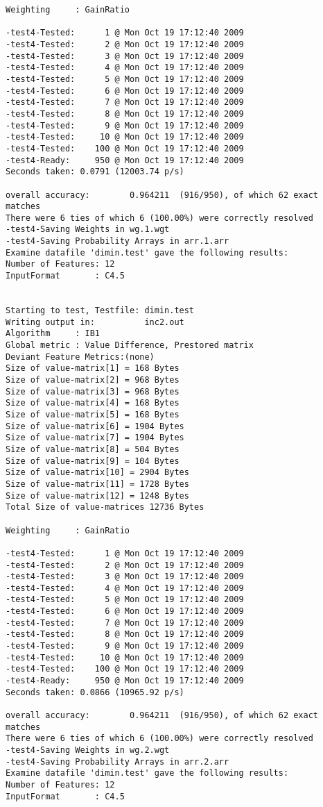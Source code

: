 \documentclass{report}
\begin{document}
\begin{footnotesize}
\begin{verbatim}
Weighting     : GainRatio

-test4-Tested:      1 @ Mon Oct 19 17:12:40 2009
-test4-Tested:      2 @ Mon Oct 19 17:12:40 2009
-test4-Tested:      3 @ Mon Oct 19 17:12:40 2009
-test4-Tested:      4 @ Mon Oct 19 17:12:40 2009
-test4-Tested:      5 @ Mon Oct 19 17:12:40 2009
-test4-Tested:      6 @ Mon Oct 19 17:12:40 2009
-test4-Tested:      7 @ Mon Oct 19 17:12:40 2009
-test4-Tested:      8 @ Mon Oct 19 17:12:40 2009
-test4-Tested:      9 @ Mon Oct 19 17:12:40 2009
-test4-Tested:     10 @ Mon Oct 19 17:12:40 2009
-test4-Tested:    100 @ Mon Oct 19 17:12:40 2009
-test4-Ready:     950 @ Mon Oct 19 17:12:40 2009
Seconds taken: 0.0791 (12003.74 p/s)

overall accuracy:        0.964211  (916/950), of which 62 exact matches 
There were 6 ties of which 6 (100.00%) were correctly resolved
-test4-Saving Weights in wg.1.wgt
-test4-Saving Probability Arrays in arr.1.arr
Examine datafile 'dimin.test' gave the following results:
Number of Features: 12
InputFormat       : C4.5


Starting to test, Testfile: dimin.test
Writing output in:          inc2.out
Algorithm     : IB1
Global metric : Value Difference, Prestored matrix
Deviant Feature Metrics:(none)
Size of value-matrix[1] = 168 Bytes 
Size of value-matrix[2] = 968 Bytes 
Size of value-matrix[3] = 968 Bytes 
Size of value-matrix[4] = 168 Bytes 
Size of value-matrix[5] = 168 Bytes 
Size of value-matrix[6] = 1904 Bytes 
Size of value-matrix[7] = 1904 Bytes 
Size of value-matrix[8] = 504 Bytes 
Size of value-matrix[9] = 104 Bytes 
Size of value-matrix[10] = 2904 Bytes 
Size of value-matrix[11] = 1728 Bytes 
Size of value-matrix[12] = 1248 Bytes 
Total Size of value-matrices 12736 Bytes 

Weighting     : GainRatio

-test4-Tested:      1 @ Mon Oct 19 17:12:40 2009
-test4-Tested:      2 @ Mon Oct 19 17:12:40 2009
-test4-Tested:      3 @ Mon Oct 19 17:12:40 2009
-test4-Tested:      4 @ Mon Oct 19 17:12:40 2009
-test4-Tested:      5 @ Mon Oct 19 17:12:40 2009
-test4-Tested:      6 @ Mon Oct 19 17:12:40 2009
-test4-Tested:      7 @ Mon Oct 19 17:12:40 2009
-test4-Tested:      8 @ Mon Oct 19 17:12:40 2009
-test4-Tested:      9 @ Mon Oct 19 17:12:40 2009
-test4-Tested:     10 @ Mon Oct 19 17:12:40 2009
-test4-Tested:    100 @ Mon Oct 19 17:12:40 2009
-test4-Ready:     950 @ Mon Oct 19 17:12:40 2009
Seconds taken: 0.0866 (10965.92 p/s)

overall accuracy:        0.964211  (916/950), of which 62 exact matches 
There were 6 ties of which 6 (100.00%) were correctly resolved
-test4-Saving Weights in wg.2.wgt
-test4-Saving Probability Arrays in arr.2.arr
Examine datafile 'dimin.test' gave the following results:
Number of Features: 12
InputFormat       : C4.5



\end{verbatim}
\end{footnotesize}
\end{document}
